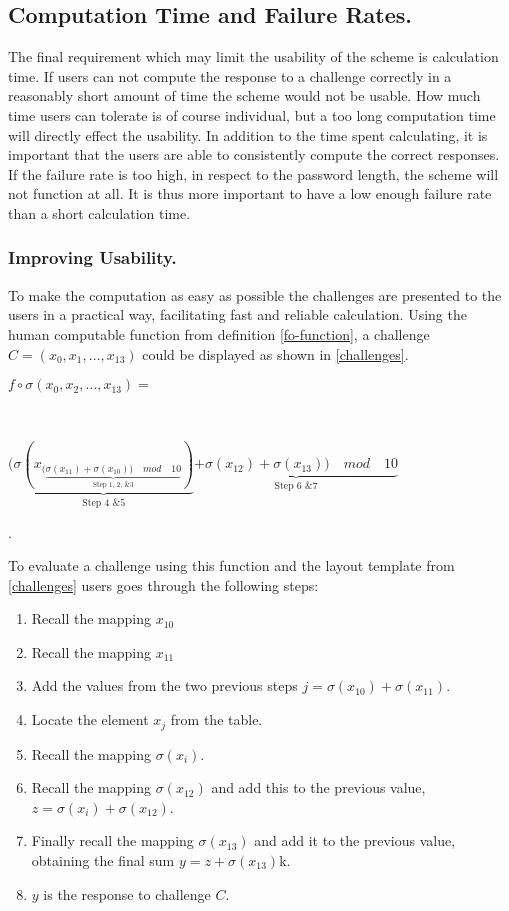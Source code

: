     \subsection{Computation Time and Failure Rates.}\label{computation-time}
The final requirement which may limit the usability of the scheme is calculation time. If users can not compute the response to a challenge correctly in a reasonably short amount of time the scheme would not be usable. How much time users can tolerate is of course individual, but a too long computation time will directly effect the usability. In addition to the time spent calculating, it is important that the users are able to consistently compute the correct responses. If the failure rate is too high, in respect to the password length, the scheme will not function at all. It is thus more important to have a low enough failure rate than a short calculation time.


\subsubsection{Improving Usability.}\label{improving-usab}

\par To make the computation as easy as possible the challenges are presented to the users in a practical way, facilitating fast and reliable calculation. Using the human computable function from definition \ref{fo-function}, a challenge $C = (x_0, x_1,\dots, x_{13})$ could be displayed as shown in \autoref{challenges}. \\ 
\centerline{ $f\circ \sigma(x_0,x_2,\dots,x_{13}) =$} \\
\centerline{$\big(\underbrace{\sigma ( x_{ (\underbrace{\sigma(x_{11}) + \sigma(x_{10}) )\quad mod \quad 10}_\text{Step 1, 2, \& 3}} )}_\text{Step 4 \& 5} \underbrace{ +\sigma ( x_{12} ) + \sigma( x_{13} )\big)\quad mod \quad 10 }_\text{Step 6 \& 7}$ }. 

To evaluate a challenge using this function and the layout template from \autoref{challenges} users goes through the following steps:
\begin{enumerate}
    \item Recall the mapping $x_{10}$
    \item Recall the mapping $x_{11}$ 
    \item Add the values from the two previous steps $j = \sigma(x_{10}) + \sigma(x_{11})$.
    \item Locate the element $x_j$ from the table.
    \item Recall the mapping $\sigma(x_i)$.
    \item Recall the mapping $\sigma(x_{12})$ and add this to the previous value, $z = \sigma(x_i) + \sigma(x_{12})$.
    \item Finally recall the mapping $\sigma(x_{13})$ and add it to the previous value, obtaining the final sum $y = z + \sigma(x_{13})$k.
    \item $y$ is the response to challenge $C$.
\end{enumerate}


